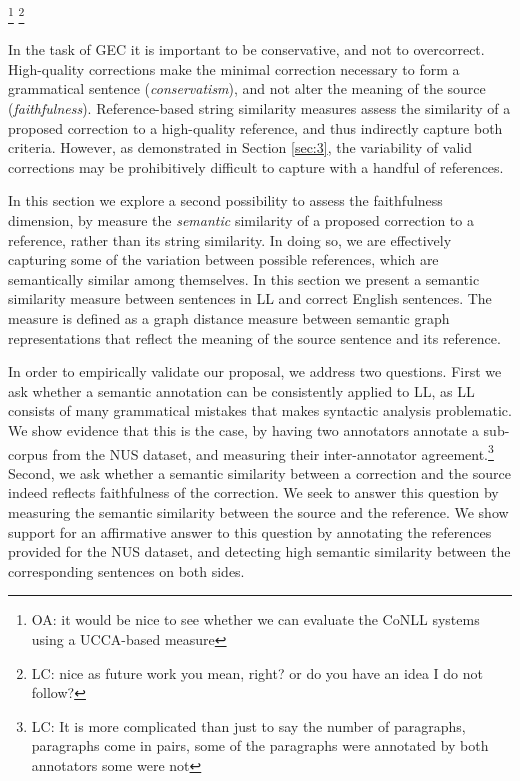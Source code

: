 \documentclass[english]{article}
\newcommand{\oa}[1]{\footnote{\color{red}OA: #1}}
\newcommand{\lc}[1]{\footnote{\color{green}LC: #1}}
\begin{document}


\oa{it would be nice to see whether we can evaluate the CoNLL systems using
a UCCA-based measure} \lc{nice as future work you mean, right? or do you have an idea I do not follow?}


In the task of GEC it is important to be
conservative, and not to overcorrect. High-quality corrections make the minimal correction
necessary to form a grammatical sentence (\textit{conservatism}), and not alter the
meaning of the source (\textit{faithfulness}). Reference-based string similarity measures
assess the similarity of a proposed correction to a high-quality reference, 
and thus indirectly capture both criteria. However, as demonstrated in Section \ref{sec:3},
the variability of valid corrections may be prohibitively difficult
to capture with a handful of references.

In this section we explore a second possibility to assess the faithfulness dimension, by
measure the {\it semantic} similarity of a proposed correction to a reference, rather
than its string similarity. In doing so, we are effectively capturing some of the variation
between possible references, which are semantically similar among themselves.
In this section we present a semantic similarity measure between sentences in LL and
correct English sentences. The measure is defined as a graph distance measure between
semantic graph representations that reflect the meaning of the source sentence and its
reference. 

In order to empirically validate our proposal, we address two
questions. First we ask whether a semantic annotation can be consistently
applied to LL, as LL consists of many grammatical mistakes that makes syntactic analysis problematic. We show evidence
that this is the case, by having two annotators annotate a sub-corpus from
the NUS dataset, and measuring their inter-annotator agreement.\lc{It is more complicated than just to say the number of paragraphs, paragraphs come in pairs, some of the paragraphs were annotated by both annotators some were not}
Second, we ask whether a semantic similarity between a correction and the source indeed
reflects faithfulness of the correction. We seek to answer this question by measuring
the semantic similarity between the source and the reference. We show support for
an affirmative answer to this question 
by annotating the references provided for the NUS dataset,
and detecting high semantic similarity between the corresponding sentences on both
sides. 
\end{document}
